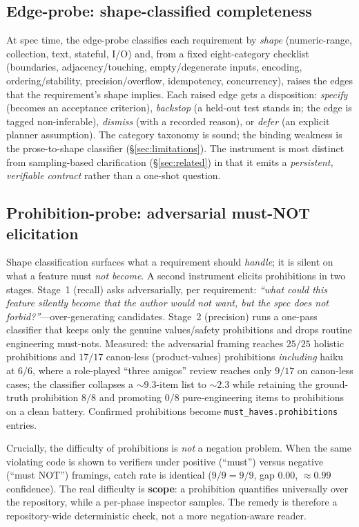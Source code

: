 \documentclass[11pt]{article}
\newcommand{\code}[1]{\texttt{#1}}
\begin{document}
\subsection{Edge-probe: shape-classified completeness}
At spec time, the edge-probe classifies each requirement by \emph{shape} (numeric-range, collection,
text, stateful, I/O) and, from a fixed eight-category checklist (boundaries, adjacency/touching,
empty/degenerate inputs, encoding, ordering/stability, precision/overflow, idempotency,
concurrency), raises the edges that the requirement's shape implies. Each raised edge gets a
disposition: \emph{specify} (becomes an acceptance criterion), \emph{backstop} (a held-out test
stands in; the edge is tagged non-inferable), \emph{dismiss} (with a recorded reason), or
\emph{defer} (an explicit planner assumption). The category taxonomy is sound; the binding weakness
is the prose-to-shape classifier (\S\ref{sec:limitations}). The instrument is most distinct from
sampling-based clarification (\S\ref{sec:related}) in that it emits a \emph{persistent, verifiable
contract} rather than a one-shot question.

\subsection{Prohibition-probe: adversarial must-NOT elicitation}
Shape classification surfaces what a requirement should \emph{handle}; it is silent on what a feature
must \emph{not become}. A second instrument elicits prohibitions in two stages. Stage~1 (recall) asks
adversarially, per requirement: \emph{``what could this feature silently become that the author would
not want, but the spec does not forbid?''}---over-generating candidates. Stage~2 (precision) runs a
one-pass classifier that keeps only the genuine values/safety prohibitions and drops routine
engineering must-nots. Measured: the adversarial framing reaches $25/25$ holistic prohibitions and
$17/17$ canon-less (product-values) prohibitions \emph{including} haiku at $6/6$, where a
role-played ``three amigos'' review reaches only $9/17$ on canon-less cases; the classifier collapses
a $\sim\!9.3$-item list to $\sim\!2.3$ while retaining the ground-truth prohibition $8/8$ and
promoting $0/8$ pure-engineering items to prohibitions on a clean battery. Confirmed prohibitions
become \code{must\_haves.prohibitions} entries.

Crucially, the difficulty of prohibitions is \emph{not} a negation problem. When the same violating
code is shown to verifiers under positive (``must'') versus negative (``must NOT'') framings, catch
rate is identical ($9/9 = 9/9$, gap $0.00$, $\approx\!0.99$ confidence). The real difficulty is
\textbf{scope}: a prohibition quantifies universally over the repository, while a per-phase inspector
samples. The remedy is therefore a repository-wide deterministic check, not a more negation-aware
reader.
\end{document}
